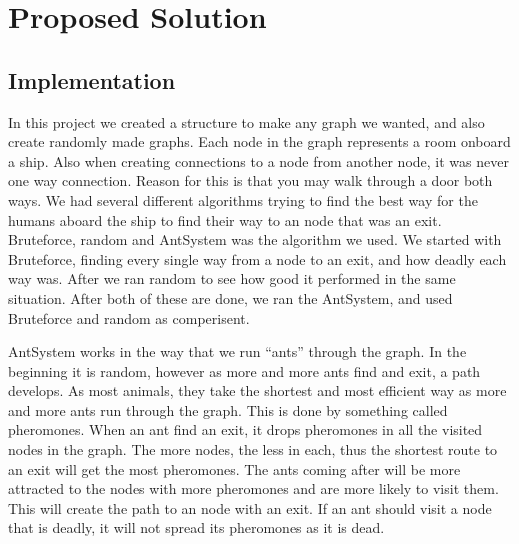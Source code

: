 \chapter{Proposed Solution}
\label{ch:solution}


\section{Implementation}

In this project we created a structure to make any graph we wanted, and also create randomly made graphs. Each node in the graph represents a room onboard a ship. Also when creating connections to a node from another node, it was never one way connection. Reason for this is that you may walk through a door both ways. We had several different algorithms trying to find the best way for the humans aboard the ship to find their way to an node that was an exit. Bruteforce, random and AntSystem was the algorithm we used. We started with Bruteforce, finding every single way from a node to an exit, and how deadly each way was. After we ran random to see how good it performed in the same situation. After both of these are done, we ran the AntSystem, and used Bruteforce and random as comperisent.

AntSystem works in the way that we run “ants” through the graph. In the beginning it is random, however as more and more ants find and exit, a path develops. As most animals, they take the shortest and most efficient way as more and more ants run through the graph. This is done by something called pheromones. When an ant find an exit, it drops pheromones in all the visited nodes in the graph. The more nodes, the less in each, thus the shortest route to an exit will get the most pheromones. The ants coming after will be more attracted to the nodes with more pheromones and are more likely to visit them. This will create the path to an node with an exit. If an ant should visit a node that is deadly, it will not spread its pheromones as it is dead.



